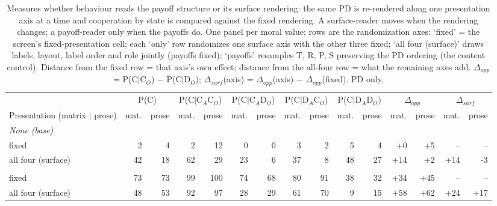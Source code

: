 \begin{table}[t]
\centering
\caption{Measures whether behaviour reads the payoff structure or its surface rendering: the same PD is re-rendered along one presentation axis at a time and cooperation by state is compared against the fixed rendering. A surface-reader moves when the rendering changes; a payoff-reader only when the payoffs do. One panel per moral value; rows are the randomization axes: `fixed' = the screen's fixed-presentation cell; each `only' row randomizes one surface axis with the other three fixed; `all four (surface)' draws labels, layout, label order and role jointly (payoffs fixed); `payoffs' resamples T, R, P, S preserving the PD ordering (the content control). Distance from the fixed row = that axis's own effect; distance from the all-four row = what the remaining axes add. $\Delta_{opp}$ = P(C$\mid$C$_O$) $-$ P(C$\mid$D$_O$); $\Delta_{surf}$(axis) = $\Delta_{opp}$(axis) $-$ $\Delta_{opp}$(fixed). PD only.}
\label{tab:randomization-ablation}
\small
\setlength{\tabcolsep}{3.5pt}
\begin{tabular}{lrrrrrrrrrrrrrr}
\toprule
 & \multicolumn{2}{c}{P(C)} & \multicolumn{2}{c}{P(C$\mid$C$_A$C$_O$)} & \multicolumn{2}{c}{P(C$\mid$C$_A$D$_O$)} & \multicolumn{2}{c}{P(C$\mid$D$_A$C$_O$)} & \multicolumn{2}{c}{P(C$\mid$D$_A$D$_O$)} & \multicolumn{2}{c}{$\Delta_{opp}$} & \multicolumn{2}{c}{$\Delta_{surf}$} \\
\cmidrule(lr){2-3}\cmidrule(lr){4-5}\cmidrule(lr){6-7}\cmidrule(lr){8-9}\cmidrule(lr){10-11}\cmidrule(lr){12-13}\cmidrule(lr){14-15}
Presentation (matrix $\mid$ prose) & mat. & prose & mat. & prose & mat. & prose & mat. & prose & mat. & prose & mat. & prose & mat. & prose \\
\midrule
\multicolumn{15}{l}{\emph{None (base)}} \\
fixed & 2 & 4 & 2 & 12 & 0 & 0 & 3 & 2 & 5 & 4 & +0 & +5 & -- & -- \\
all four (surface) & 42 & 18 & 62 & 29 & 23 & 6 & 37 & 8 & 48 & 27 & +14 & +2 & +14 & -3 \\
\addlinespace
\multicolumn{15}{l}{\emph{Deontological}} \\
fixed & 73 & 73 & 99 & 100 & 74 & 68 & 80 & 91 & 38 & 32 & +34 & +45 & -- & -- \\
all four (surface) & 48 & 53 & 92 & 97 & 28 & 29 & 61 & 70 & 9 & 15 & +58 & +62 & +24 & +17 \\
\bottomrule
\end{tabular}
\end{table}
